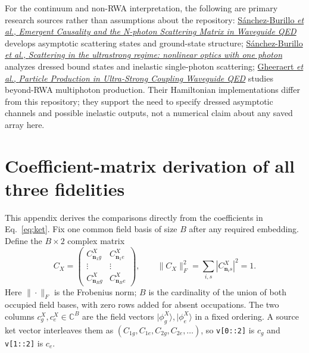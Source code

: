 \documentclass[11pt,a4paper]{article}
\newcommand{\ket}[1]{\lvert #1\rangle}
\newcommand{\code}[1]{\nolinkurl{#1}}
\begin{document}
For the continuum and non-RWA interpretation, the following are primary research sources rather than assumptions about the repository: \href{https://arxiv.org/abs/1705.09094}{S\'anchez-Burillo \emph{et al.}, \emph{Emergent Causality and the N-photon Scattering Matrix in Waveguide QED}} develops asymptotic scattering states and ground-state structure; \href{https://arxiv.org/abs/1406.5779}{S\'anchez-Burillo \emph{et al.}, \emph{Scattering in the ultrastrong regime: nonlinear optics with one photon}} analyzes dressed bound states and inelastic single-photon scattering; \href{https://arxiv.org/abs/1802.01665}{Gheeraert \emph{et al.}, \emph{Particle Production in Ultra-Strong Coupling Waveguide QED}} studies beyond-RWA multiphoton production. Their Hamiltonian implementations differ from this repository; they support the need to specify dressed asymptotic channels and possible inelastic outputs, not a numerical claim about any saved array here.

\appendix
\section{Coefficient-matrix derivation of all three fidelities}
\label{app:matrix}
This appendix derives the comparisons directly from the coefficients in Eq.~\eqref{eq:ket}. Fix one common field basis of size $B$ after any required embedding. Define the $B\times2$ complex matrix
\begin{equation}
 C_X=\begin{pmatrix}
 C^X_{\mathbf n_1g}&C^X_{\mathbf n_1e}\\
 \vdots&\vdots\\
 C^X_{\mathbf n_Bg}&C^X_{\mathbf n_Be}
 \end{pmatrix},\qquad
 \|C_X\|_F^2=\sum_{i,s}|C^X_{\mathbf n_i s}|^2=1.
 \label{eq:coeffmatrix}
\end{equation}
Here $\|\cdot\|_F$ is the Frobenius norm; $B$ is the cardinality of the union of both occupied field bases, with zero rows added for absent occupations. The two columns $c_g^X,c_e^X\in\mathbb C^B$ are the field vectors $\ket{\phi_g^X},\ket{\phi_e^X}$ in a fixed ordering. A source ket vector interleaves them as $(C_{1g},C_{1e},C_{2g},C_{2e},\ldots)$, so \code{v[0::2]} is $c_g$ and \code{v[1::2]} is $c_e$.
\end{document}
